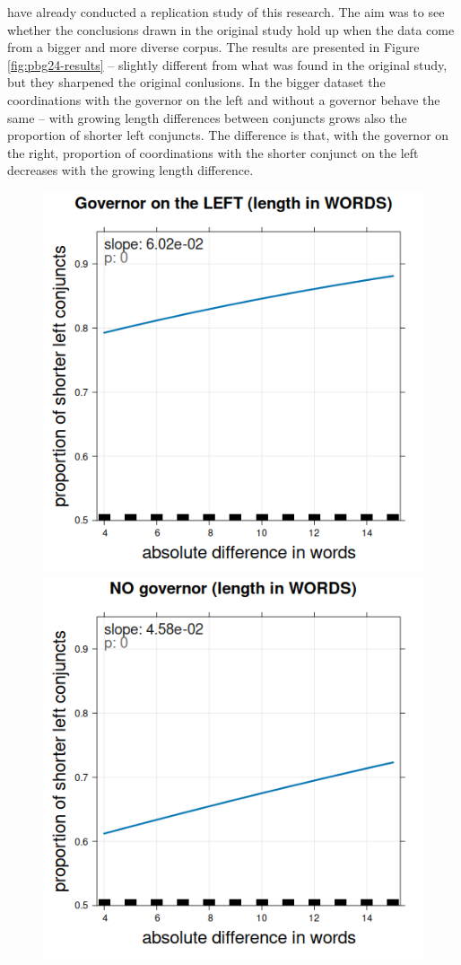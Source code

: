 \cite{pbg2023} have already conducted a replication study of this research. The aim was to see whether the conclusions drawn in the original study hold up when the data come from a bigger and more diverse corpus. The results are presented in Figure \ref{fig:pbg24-results} -- slightly different from what was found in the original study, but they sharpened the original conlusions. In the bigger dataset the coordinations with the governor on the left and without a governor behave the same -- with growing length differences between conjuncts grows also the proportion of shorter left conjuncts. The difference is that, with the governor on the right, proportion of coordinations with the shorter conjunct on the left decreases with the growing length difference. 

\begin{figure}[H]
    \centering
    \includegraphics[scale=0.27]{inputs/coca-L.png}
    \includegraphics[scale=0.27]{inputs/coca-0.png}

\end{figure}
